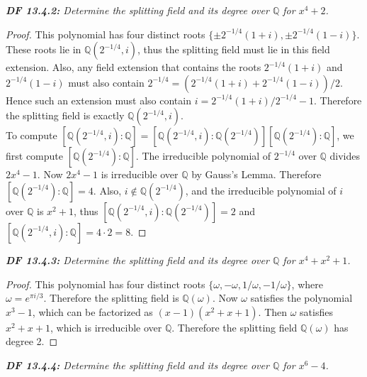 \documentclass{article}
\begin{document}
\it \textbf{DF 13.4.2:} Determine the splitting field and its degree over
  $\mathbb{Q}$ for $x^4+2$.

  \begin{proof}
    This polynomial has four distinct roots $\{\pm2^{-1/4}(1+i),
    \pm2^{-1/4}(1-i)\}$. These roots lie in $\mathbb{Q}(2^{-1/4},i)$, thus
    the splitting field must lie in this field extension. Also, any field
    extension that contains the roots $2^{-1/4}(1+i)$ and $2^{-1/4}(1-i)$
    must also contain $2^{-1/4}=(2^{-1/4}(1+i) +2^{-1/4}(1-i))/2$. Hence
    such an extension must also contain $i=2^{-1/4}(1+i)/2^{-1/4}-1$.
    Therefore the splitting field is exactly $\mathbb{Q}(2^{-1/4},i)$. \\

    To compute $[\mathbb{Q}(2^{-1/4},i):\mathbb{Q}]
    =[\mathbb{Q}(2^{-1/4},i):\mathbb{Q}(2^{-1/4})]
    [\mathbb{Q}(2^{-1/4}):\mathbb{Q}]$, we first compute
    $[\mathbb{Q}(2^{-1/4}):\mathbb{Q}]$. The irreducible
    polynomial of $2^{-1/4}$ over $\mathbb{Q}$ divides $2x^4-1$. Now
    $2x^4-1$ is irreducible over $\mathbb{Q}$ by Gauss's Lemma. Therefore
    $[\mathbb{Q}(2^{-1/4}):\mathbb{Q}]=4$. Also,
    $i\not\in\mathbb{Q}(2^{-1/4})$, and the irreducible polynomial of
    $i$ over $\mathbb{Q}$ is $x^2+1$, thus
    $[\mathbb{Q}(2^{-1/4},i):\mathbb{Q}(2^{-1/4})]=2$ and
    $[\mathbb{Q}(2^{-1/4},i):\mathbb{Q}]=4\cdot2=8$.
  \end{proof}

\it \textbf{DF 13.4.3:} Determine the splitting field and its degree over
  $\mathbb{Q}$ for $x^4+x^2+1$.

  \begin{proof}
    This polynomial has four distinct roots
    $\{\omega,-\omega,1/\omega,-1/\omega\}$, where $\omega=e^{\pi i/3}$.
    Therefore the splitting field is $\mathbb{Q}(\omega)$. Now $\omega$
    satisfies the polynomial $x^3-1$, which can be factorized as
    $(x-1)(x^2+x+1)$. Then $\omega$ satisfies $x^2+x+1$, which is
    irreducible over $\mathbb{Q}$. Therefore the splitting field
    $\mathbb{Q}(\omega)$ has degree 2.
  \end{proof}

\it \textbf{DF 13.4.4:} Determine the splitting field and its degree over
  $\mathbb{Q}$ for $x^6-4$.
\end{document}
